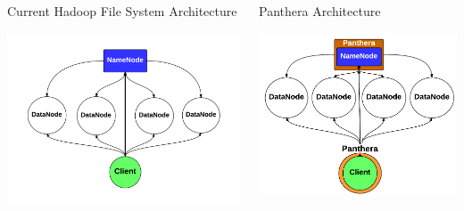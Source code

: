 \documentclass[final]{beamer} %
\begin{document}
\begin{frame}
\begin{columns}[t]
\begin{column}{0.32\textwidth}
		\begin{block}{Current Hadoop File System Architecture}
			\centerline{\includegraphics[scale=1.5]{assets/vanilla_hadoop.pdf}}
		\end{block}
		
	  

     \end{column}

    \begin{column}{0.32\textwidth}
		\begin{block}{Panthera Architecture}
		\vspace{1em}
		\centerline{\includegraphics[scale=1.5]{assets/v2/panthera_hadoop_arch.pdf}}	  
	  \end{block}   	  


\end{column}
\end{columns}
\end{frame}
\end{document}
